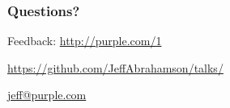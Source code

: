 \documentclass{beamer}
\newcommand\smallgray[1]{\textcolor{gray}{\footnotesize\it #1}}
\newcommand\prevwork[1]{\smallgray{#1}}
\begin{document}
\begin{frame}
  \frametitle{Questions?}

  \centerline{Feedback: \url{http://purple.com/1}}
  \vspace{1.5cm}
  \centerline{\url{https://github.com/JeffAbrahamson/talks/}}
  \vspace{1cm}
  \centerline{\url{jeff@purple.com}}
\end{frame}

\end{document}

